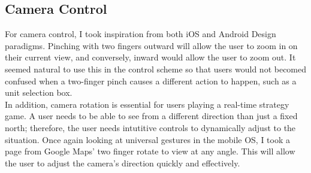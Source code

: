 \documentclass[11pt]{article}
\begin{document}
	\subsection{Camera Control}
	For camera control, I took inspiration from both iOS and Android Design paradigms. Pinching with two fingers outward will allow the user to zoom in on their current view, and conversely, inward would allow the user to zoom out. It seemed natural to use this in the control scheme so that users would not becomed confused when a two-finger pinch causes a different action to happen, such as a unit selection box. \\
	\indent In addition, camera rotation is essential for users playing a real-time strategy game. A user needs to be able to see from a different direction than just a fixed north; therefore, the user needs intutitive controls to dynamically adjust to the situation. Once again looking at universal gestures in the mobile OS, I took a page from Google Maps' two finger rotate to view at any angle. This will allow the user to adjust the camera's direction quickly and effectively.
\end{document}
